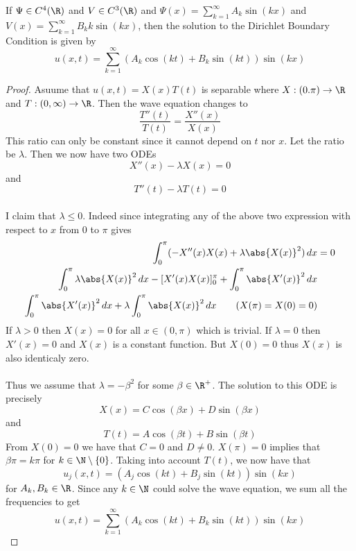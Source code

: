 \documentclass[a4paper]{article}
\begin{document}
\begin{prp}{}{} If $\Psi\in C^4(\R)$ and $V\in C^3(\R)$ and $\Psi(x)=\sum_{k=1}^\infty A_k\sin(kx)$ and $V(x)=\sum_{k=1}^\infty B_kk\sin(kx)$, then the solution to the Dirichlet Boundary Condition is given by $$u(x,t)=\sum_{k=1}^\infty\left(A_k\cos(kt)+B_k\sin(kt)\right)\sin(kx)$$ \tcbline
\begin{proof}
Asuume that $u(x,t)=X(x)T(t)$ is separable where $X:(0.\pi)\to\R$ and $T:(0,\infty)\to\R$. Then the wave equation changes to $$\frac{T''(t)}{T(t)}=\frac{X''(x)}{X(x)}$$ This ratio can only be constant since it cannot depend on $t$ nor $x$. Let the ratio be $\lambda$. Then we now have two ODEs $$X''(x)-\lambda X(x)=0$$ and $$T''(t)-\lambda T(t)=0$$~\\
I claim that $\lambda\leq 0$. Indeed since integrating any of the above two expression with respect to $x$ from $0$ to $\pi$ gives
\begin{align*}
\int_0^\pi(-X''(x)X(x)+\lambda\abs{X(x)}^2)\,dx&=0\\
\int_0^\pi\lambda\abs{X(x)}^2\,dx-[X'(x)X(x)]_0^\pi+\int_0^\pi\abs{X'(x)}^2\,dx\\
\int_0^\pi\abs{X'(x)}^2\,dx+\lambda\int_0^\pi\abs{X(x)}^2\,dx\tag{$X(\pi)=X(0)=0$}
\end{align*}
If $\lambda>0$ then $X(x)=0$ for all $x\in(0,\pi)$ which is trivial. If $\lambda=0$ then $X'(x)=0$ and $X(x)$ is a constant function. But $X(0)=0$ thus $X(x)$ is also identicaly zero. \\~\\
Thus we assume that $\lambda=-\beta^2$ for some $\beta\in\R^+$. The solution to this ODE is precisely $$X(x)=C\cos(\beta x)+D\sin(\beta x)$$ and $$T(t)=A\cos(\beta t)+B\sin(\beta t)$$ From $X(0)=0$ we have that $C=0$ and $D\neq 0$. $X(\pi)=0$ implies that $\beta\pi=k\pi$ for $k\in\N\setminus\{0\}$. Taking into account $T(t)$, we now have that $$u_j(x,t)=(A_j\cos(kt)+B_j\sin(kt))\sin(kx)$$ for $A_k,B_k\in\R$. Since any $k\in\N$ could solve the wave equation, we sum all the frequencies to get $$u(x,t)=\sum_{k=1}^\infty(A_k\cos(kt)+B_k\sin(kt))\sin(kx)$$
\end{proof}
\end{prp}
\end{document}
